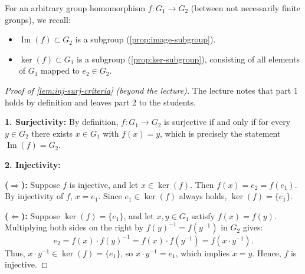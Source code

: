 \begin{content}
For an arbitrary group homomorphism $f \colon G_1 \to G_2$ (between not necessarily finite groups), we recall:
\begin{itemize}
    \item $\operatorname{Im}(f) \subset G_2$ is a subgroup (\cref{prop:image-subgroup}).
    \item $\ker(f) \subset G_1$ is a subgroup (\cref{prop:ker-subgroup}), consisting of all elements of $G_1$ mapped to $e_2 \in G_2$.
\end{itemize}


\begin{proof}[Proof of \cref{lem:inj-surj-criteria} (beyond the lecture)]
The lecture notes that part 1 holds by definition and leaves part 2 to the students.

\textbf{1. Surjectivity:} By definition, $f \colon G_1 \to G_2$ is surjective if and only if for every $y \in G_2$ there exists $x \in G_1$ with $f(x) = y$, which is precisely the statement $\operatorname{Im}(f) = G_2$.

\textbf{2. Injectivity:}

\textbf{($\Rightarrow$):} Suppose $f$ is injective, and let $x \in \ker(f)$. Then $f(x) = e_2 = f(e_1)$. By injectivity of $f$, $x = e_1$. Since $e_1 \in \ker(f)$ always holds, $\ker(f) = \{e_1\}$.

\textbf{($\Leftarrow$):} Suppose $\ker(f) = \{e_1\}$, and let $x, y \in G_1$ satisfy $f(x) = f(y)$. Multiplying both sides on the right by $f(y)^{-1} = f(y^{-1})$ in $G_2$ gives:
\[
e_2 = f(x) \cdot f(y)^{-1} = f(x) \cdot f(y^{-1}) = f(x \cdot y^{-1}).
\]
Thus, $x \cdot y^{-1} \in \ker(f) = \{e_1\}$, so $x \cdot y^{-1} = e_1$, which implies $x = y$. Hence, $f$ is injective.
\end{proof}
\end{content}

